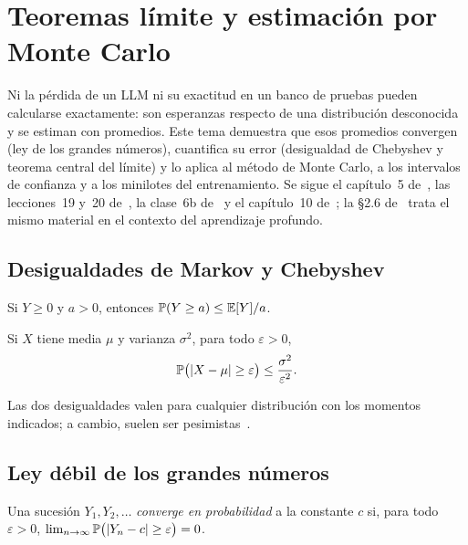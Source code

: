 \chapter{Teoremas límite y estimación por Monte Carlo}
\label{tema:5}

Ni la pérdida de un LLM ni su exactitud en un banco de pruebas pueden calcularse exactamente: son esperanzas respecto de una distribución desconocida y se estiman con promedios. Este tema demuestra que esos promedios convergen (ley de los grandes números), cuantifica su error (desigualdad de Chebyshev y teorema central del límite) y lo aplica al método de Monte Carlo, a los intervalos de confianza y a los minilotes del entrenamiento. Se sigue el capítulo~5 de~\cite{bt}, las lecciones~19 y~20 de~\cite{mit6041}, la clase~6b de~\cite{mit1805} y el capítulo~10 de~\cite{bh}; la §2.6 de~\cite{d2l} trata el mismo material en el contexto del aprendizaje profundo.

\section{Desigualdades de Markov y Chebyshev}

\begin{teorema}\label{teo:markov}
Si $Y\ge 0$ y $a>0$, entonces $\mathbb{P}(Y\ge a)\le\mathbb{E}[Y]/a$.
\end{teorema}

\begin{teorema}\label{teo:chebyshev}
Si $X$ tiene media $\mu$ y varianza $\sigma^{2}$, para todo $\varepsilon>0$,
\[
\mathbb{P}\bigl(\lvert X-\mu\rvert\ge\varepsilon\bigr)\le\frac{\sigma^{2}}{\varepsilon^{2}}.
\]
\end{teorema}

Las dos desigualdades valen para cualquier distribución con los momentos indicados; a cambio, suelen ser pesimistas~\cite[§5.1]{bt}.

\section{Ley débil de los grandes números}

\begin{definicion}
Una sucesión $Y_1,Y_2,\dots$ \emph{converge en probabilidad} a la constante $c$ si, para todo $\varepsilon>0$, $\lim_{n\to\infty}\mathbb{P}\bigl(\lvert Y_n-c\rvert\ge\varepsilon\bigr)=0$.
\end{definicion}

